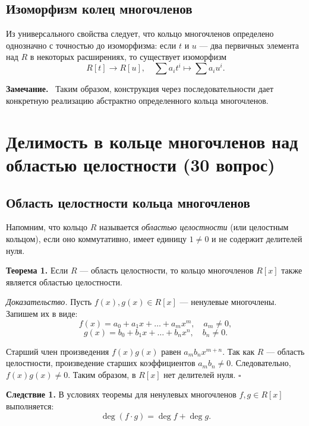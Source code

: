 \documentclass[a4paper,12pt]{article}
\newcommand{\myremark}{\textbf{Замечание.}\ }
\theoremstyle{definition}
\theoremstyle{plain}
\theoremstyle{remark}
\begin{document}
	\subsection{Изоморфизм колец многочленов}
	
	Из универсального свойства следует, что кольцо многочленов определено однозначно с точностью до изоморфизма: если \( t \) и \( u \) — два первичных элемента над \( R \) в некоторых расширениях, то существует изоморфизм
	\[
	R[t] \to R[u], \quad \sum a_i t^i \mapsto \sum a_i u^i.
	\]
	
	\myremark
	Таким образом, конструкция через последовательности дает конкретную реализацию абстрактно определенного кольца многочленов.
	
	
	
	
	
	
	
	\newpage
	\section{Делимость в кольце многочленов над областью целостности (30 вопрос)}
	
	\subsection{Область целостности кольца многочленов}
	
	Напомним, что кольцо \( R \) называется \textit{областью целостности} (или целостным кольцом), если оно коммутативно, имеет единицу \( 1 \neq 0 \) и не содержит делителей нуля.
	
	\medskip
	\noindent \textbf{Теорема 1.} Если \( R \) — область целостности, то кольцо многочленов \( R[x] \) также является областью целостности.
	
	\medskip
	\textit{Доказательство.}
	Пусть \( f(x), g(x) \in R[x] \) — ненулевые многочлены. Запишем их в виде:
	\[
	f(x) = a_0 + a_1x + \dots + a_m x^m, \quad a_m \neq 0,
	\]
	\[
	g(x) = b_0 + b_1x + \dots + b_n x^n, \quad b_n \neq 0.
	\]
	
	Старший член произведения \( f(x)g(x) \) равен \( a_m b_n x^{m+n} \). Так как \( R \) — область целостности, произведение старших коэффициентов \( a_m b_n \neq 0 \). Следовательно, \( f(x)g(x) \neq 0 \). Таким образом, в \( R[x] \) нет делителей нуля. \hfill \(\square\)
	
	\medskip
	\noindent \textbf{Следствие 1.} В условиях теоремы для ненулевых многочленов \( f, g \in R[x] \) выполняется:
	\[
	\deg(f \cdot g) = \deg f + \deg g.
	\]
	
\end{document}
